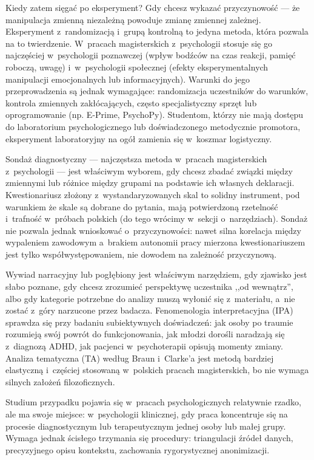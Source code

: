 \documentclass[12pt,a4paper,twoside,openany]{book}
\begin{document}
Kiedy zatem sięgać po eksperyment? Gdy chcesz wykazać przyczynowość --- że manipulacja zmienną niezależną powoduje zmianę zmiennej zależnej. Eksperyment z~randomizacją i~grupą kontrolną to jedyna metoda, która pozwala na to twierdzenie. W~pracach magisterskich z~psychologii stosuje się go najczęściej w~psychologii poznawczej (wpływ bodźców na czas reakcji, pamięć roboczą, uwagę) i~w~psychologii społecznej (efekty eksperymentalnych manipulacji emocjonalnych lub informacyjnych). Warunki do jego przeprowadzenia są jednak wymagające: randomizacja uczestników do warunków, kontrola zmiennych zakłócających, często specjalistyczny sprzęt lub oprogramowanie (np. E-Prime, PsychoPy). Studentom, którzy nie mają dostępu do laboratorium psychologicznego lub doświadczonego metodycznie promotora, eksperyment laboratoryjny na ogół zamienia się w~koszmar logistyczny.

Sondaż diagnostyczny --- najczęstsza metoda w~pracach magisterskich z~psychologii --- jest właściwym wyborem, gdy chcesz zbadać związki między zmiennymi lub różnice między grupami na podstawie ich własnych deklaracji. Kwestionariusz złożony z~wystandaryzowanych skal to solidny instrument, pod warunkiem że skale są dobrane do pytania, mają potwierdzoną rzetelność i~trafność w~próbach polskich (do tego wrócimy w~sekcji o~narzędziach). Sondaż nie pozwala jednak wnioskować o~przyczynowości: nawet silna korelacja między wypaleniem zawodowym a~brakiem autonomii pracy mierzona kwestionariuszem jest tylko współwystępowaniem, nie dowodem na zależność przyczynową.

Wywiad narracyjny lub pogłębiony jest właściwym narzędziem, gdy zjawisko jest słabo poznane, gdy chcesz zrozumieć perspektywę uczestnika ,,od wewnątrz'', albo gdy kategorie potrzebne do analizy muszą wyłonić się z~materiału, a~nie zostać z~góry narzucone przez badacza. Fenomenologia interpretacyjna (IPA) sprawdza się przy badaniu subiektywnych doświadczeń: jak osoby po traumie rozumieją swój powrót do funkcjonowania, jak młodzi dorośli naradzają się z~diagnozą ADHD, jak pacjenci w~psychoterapii opisują momenty zmiany. Analiza tematyczna (TA) według Braun i~Clarke'a jest metodą bardziej elastyczną i~częściej stosowaną w~polskich pracach magisterskich, bo nie wymaga silnych założeń filozoficznych.

Studium przypadku pojawia się w~pracach psychologicznych relatywnie rzadko, ale ma swoje miejsce: w~psychologii klinicznej, gdy praca koncentruje się na procesie diagnostycznym lub terapeutycznym jednej osoby lub małej grupy. Wymaga jednak ścisłego trzymania się procedury: triangulacji źródeł danych, precyzyjnego opisu kontekstu, zachowania rygorystycznej anonimizacji.
\end{document}
